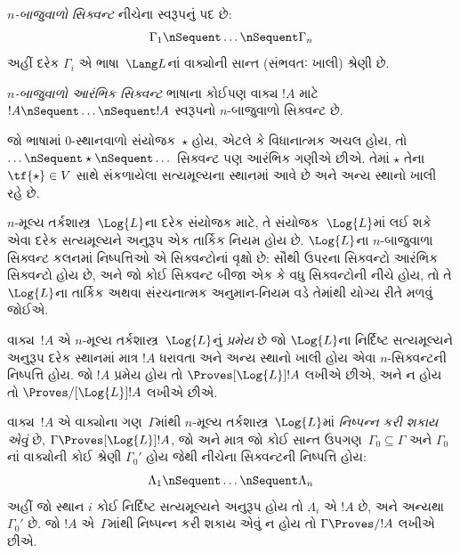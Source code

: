 \begin{defn}[સિક્વન્ટ]
\emph{$n$-બાજુવાળો સિક્વન્ટ} નીચેના સ્વરૂપનું પદ છે:
\[
\Gamma_1 \nSequent \dots \nSequent \Gamma_n
\]
અહીં દરેક $\Gamma_i$ એ ભાષા~$\Lang L$નાં વાક્યોની
સાન્ત (સંભવતઃ ખાલી) શ્રેણી છે.
\end{defn}

\begin{defn}[આરંભિક સિક્વન્ટ]
\emph{$n$-બાજુવાળો આરંભિક સિક્વન્ટ} ભાષાના કોઈપણ
વાક્ય $!A$ માટે $!A \nSequent \dots \nSequent !A$
સ્વરૂપનો $n$-બાજુવાળો સિક્વન્ટ છે.

જો ભાષામાં $0$-સ્થાનવાળો સંયોજક~$\star$ હોય, એટલે
કે વિધાનાત્મક અચલ હોય, તો $\dots \nSequent
\star \nSequent \dots$ સિક્વન્ટ પણ આરંભિક ગણીએ છીએ.
તેમાં $\star$ તેના $\tf{\star} \in V$ સાથે સંકળાયેલા
સત્યમૂલ્યના સ્થાનમાં આવે છે અને અન્ય સ્થાનો ખાલી રહે છે.
\end{defn}

$n$-મૂલ્ય તર્કશાસ્ત્ર~$\Log{L}$ના દરેક સંયોજક માટે,
તે સંયોજક~$\Log{L}$માં લઈ શકે એવા દરેક સત્યમૂલ્યને
અનુરૂપ એક તાર્કિક નિયમ હોય છે. $\Log{L}$ના $n$-બાજુવાળા
સિક્વન્ટ કલનમાં નિષ્પત્તિઓ એ સિક્વન્ટોનાં વૃક્ષો છે:
સૌથી ઉપરના સિક્વન્ટો આરંભિક સિક્વન્ટો હોય છે, અને
જો કોઈ સિક્વન્ટ બીજા એક કે વધુ સિક્વન્ટોની નીચે હોય,
તો તે $\Log{L}$ના તાર્કિક અથવા સંરચનાત્મક અનુમાન-નિયમ વડે તેમાંથી
યોગ્ય રીતે મળવું જોઈએ.

\begin{defn}[પ્રમેયો]
વાક્ય~$!A$ એ $n$-મૂલ્ય તર્કશાસ્ત્ર~$\Log{L}$નું
\emph{પ્રમેય} છે જો $\Log{L}$ના નિર્દિષ્ટ સત્યમૂલ્યને
અનુરૂપ દરેક સ્થાનમાં માત્ર $!A$ ધરાવતા અને અન્ય
સ્થાનો ખાલી હોય એવા $n$-સિક્વન્ટની
નિષ્પત્તિ હોય. જો $!A$ પ્રમેય હોય તો
$\Proves[\Log{L}] !A$ લખીએ છીએ, અને ન હોય તો
$\Proves/[\Log{L}] !A$ લખીએ છીએ.
\end{defn}

\begin{defn}[નિષ્પન્નક્ષમતા]
વાક્ય~$!A$ એ વાક્યોના ગણ~$\Gamma$માંથી
$n$-મૂલ્ય તર્કશાસ્ત્ર~$\Log{L}$માં \emph{નિષ્પન્ન કરી શકાય એવું}
છે, $\Gamma \Proves[\Log{L}] !A$, જો અને માત્ર જો
કોઈ સાન્ત ઉપગણ~$\Gamma_0 \subseteq \Gamma$
અને $\Gamma_0$નાં વાક્યોની કોઈ શ્રેણી $\Gamma_0'$
હોય જેથી નીચેના સિક્વન્ટની નિષ્પત્તિ હોય:
\[ \Lambda_1 \nSequent \dots \nSequent \Lambda_n \]
અહીં જો સ્થાન $i$ કોઈ નિર્દિષ્ટ સત્યમૂલ્યને અનુરૂપ હોય
તો $\Lambda_i$ એ $!A$ છે, અને અન્યથા $\Gamma_0'$ છે.
જો $!A$ એ~$\Gamma$માંથી નિષ્પન્ન કરી શકાય એવું ન હોય તો
$\Gamma \Proves/ !A$ લખીએ છીએ.
\end{defn}

